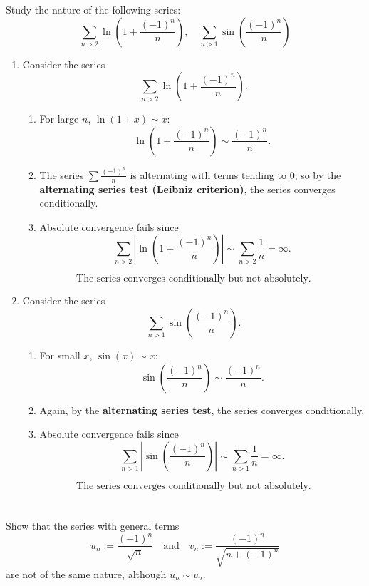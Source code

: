 \documentclass[12pt]{article}
\begin{document}
\section{}
Study the nature of the following series:
\[
\sum_{n>2} \ln\left(1 + \frac{(-1)^n}{n}\right), \quad \sum_{n>1} \sin\left(\frac{(-1)^n}{n}\right)
\]

\begin{correctionbox}
\begin{enumerate}
    \item Consider the series 
    \[
    \sum_{n>2} \ln\left(1 + \frac{(-1)^n}{n}\right).
    \]
    \begin{enumerate}
        \item For large $n$, $\ln(1+x) \sim x$:
        \[
        \ln\left(1 + \frac{(-1)^n}{n}\right) \sim \frac{(-1)^n}{n}.
        \]
        \item The series $\sum \frac{(-1)^n}{n}$ is alternating with terms tending to $0$, so by the \textbf{alternating series test (Leibniz criterion)}, the series converges conditionally.
        \item Absolute convergence fails since
        \[
        \sum_{n>2} \left|\ln\left(1 + \frac{(-1)^n}{n}\right)\right| \sim \sum_{n>2} \frac{1}{n} = \infty.
        \]
    \end{enumerate}
    \[
    \boxed{\text{The series converges conditionally but not absolutely.}}
    \]

    \item Consider the series 
    \[
    \sum_{n>1} \sin\left(\frac{(-1)^n}{n}\right).
    \]
    \begin{enumerate}
        \item For small $x$, $\sin(x) \sim x$:
        \[
        \sin\left(\frac{(-1)^n}{n}\right) \sim \frac{(-1)^n}{n}.
        \]
        \item Again, by the \textbf{alternating series test}, the series converges conditionally.
        \item Absolute convergence fails since
        \[
        \sum_{n>1} \left|\sin\left(\frac{(-1)^n}{n}\right)\right| \sim \sum_{n>1} \frac{1}{n} = \infty.
        \]
    \end{enumerate}
    \[
    \boxed{\text{The series converges conditionally but not absolutely.}}
    \]
\end{enumerate}
\end{correctionbox}

\section{}
Show that the series with general terms
\[
u_n := \frac{(-1)^n}{\sqrt{n}} \quad \text{and} \quad v_n := \frac{(-1)^n}{\sqrt{n + (-1)^n}}
\]
are not of the same nature, although \( u_n \sim v_n \).
\end{document}

